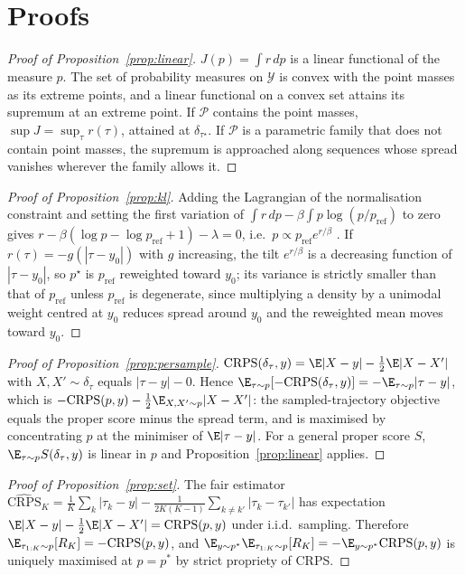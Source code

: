\documentclass{article}
\newcommand{\crps}{\mathrm{CRPS}}
\begin{document}
\section{Proofs}
\label{app:proofs}
\begin{proof}[Proof of Proposition~\ref{prop:linear}]
$J(p)=\int r\,dp$ is a linear functional of the measure $p$. The set of probability measures on $\mathcal{Y}$ is convex with the point masses as its extreme points, and a linear functional on a convex set attains its supremum at an extreme point. If $\mathcal{P}$ contains the point masses, $\sup J=\sup_\tau r(\tau)$, attained at $\delta_{\tau^\star}$. If $\mathcal{P}$ is a parametric family that does not contain point masses, the supremum is approached along sequences whose spread vanishes wherever the family allows it.
\end{proof}
\begin{proof}[Proof of Proposition~\ref{prop:kl}]
Adding the Lagrangian of the normalisation constraint and setting the first variation of $\int r\,dp-\beta\int p\log(p/p_{\mathrm{ref}})$ to zero gives $r-\beta(\log p-\log p_{\mathrm{ref}}+1)-\lambda=0$, i.e.\ $p\propto p_{\mathrm{ref}}e^{r/\beta}$ \citep{korbak2022rl}. If $r(\tau)=-g(|\tau-y_0|)$ with $g$ increasing, the tilt $e^{r/\beta}$ is a decreasing function of $|\tau-y_0|$, so $p^\star$ is $p_{\mathrm{ref}}$ reweighted toward $y_0$; its variance is strictly smaller than that of $p_{\mathrm{ref}}$ unless $p_{\mathrm{ref}}$ is degenerate, since multiplying a density by a unimodal weight centred at $y_0$ reduces spread around $y_0$ and the reweighted mean moves toward $y_0$.
\end{proof}
\begin{proof}[Proof of Proposition~\ref{prop:persample}]
$\crps(\delta_\tau,y)=\E|X-y|-\tfrac12\E|X-X'|$ with $X,X'\sim\delta_\tau$ equals $|\tau-y|-0$. Hence $\E_{\tau\sim p}[-\crps(\delta_\tau,y)]=-\E_{\tau\sim p}|\tau-y|$, which is $-\crps(p,y)-\tfrac12\E_{X,X'\sim p}|X-X'|$: the sampled-trajectory objective equals the proper score minus the spread term, and is maximised by concentrating $p$ at the minimiser of $\E|\tau-y|$. For a general proper score $S$, $\E_{\tau\sim p}S(\delta_\tau,y)$ is linear in $p$ and Proposition~\ref{prop:linear} applies.
\end{proof}
\begin{proof}[Proof of Proposition~\ref{prop:set}]
The fair estimator $\widehat{\crps}_K=\frac1K\sum_k|\tau_k-y|-\frac{1}{2K(K-1)}\sum_{k\ne k'}|\tau_k-\tau_{k'}|$ has expectation $\E|X-y|-\tfrac12\E|X-X'|=\crps(p,y)$ under i.i.d.\ sampling. Therefore $\E_{\tau_{1:K}\sim p}[R_K]=-\crps(p,y)$, and $\E_{y\sim p^*}\E_{\tau_{1:K}\sim p}[R_K]=-\E_{y\sim p^*}\crps(p,y)$ is uniquely maximised at $p=p^*$ by strict propriety of CRPS.
\end{proof}
\end{document}
